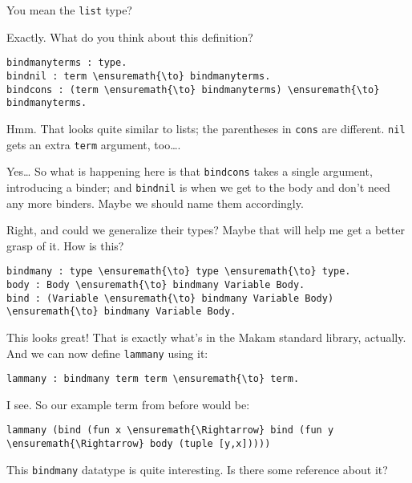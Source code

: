 \heroSTUDENT{} You mean the \texttt{list} type?

\heroADVISOR{} Exactly. What do you think about this definition?

\begin{verbatim}
bindmanyterms : type.
bindnil : term \ensuremath{\to} bindmanyterms.
bindcons : (term \ensuremath{\to} bindmanyterms) \ensuremath{\to} bindmanyterms.
\end{verbatim}

\heroSTUDENT{} Hmm. That looks quite similar to lists; the parentheses in
\texttt{cons} are different. \texttt{nil} gets an extra \texttt{term}
argument, too\ldots{}.

\heroADVISOR{} Yes\ldots{} So what is happening here is that \texttt{bindcons}
takes a single argument, introducing a binder; and \texttt{bindnil} is
when we get to the body and don't need any more binders. Maybe we should
name them accordingly.

\heroSTUDENT{} Right, and could we generalize their types? Maybe that will
help me get a better grasp of it. How is this?

\importantCodeblock{}

\begin{verbatim}
bindmany : type \ensuremath{\to} type \ensuremath{\to} type.
body : Body \ensuremath{\to} bindmany Variable Body.
bind : (Variable \ensuremath{\to} bindmany Variable Body) \ensuremath{\to} bindmany Variable Body.
\end{verbatim}

\importantCodeblockEnd{}

\heroADVISOR{} This looks great! That is exactly what's in the Makam standard
library, actually. And we can now define \texttt{lammany} using it:

\importantCodeblock{}

\begin{verbatim}
lammany : bindmany term term \ensuremath{\to} term.
\end{verbatim}

\importantCodeblockEnd{}

\heroSTUDENT{} I see. So our example term from before would be:

\begin{verbatim}
lammany (bind (fun x \ensuremath{\Rightarrow} bind (fun y \ensuremath{\Rightarrow} body (tuple [y,x]))))
\end{verbatim}

This \texttt{bindmany} datatype is quite interesting. Is there some
reference about it?

